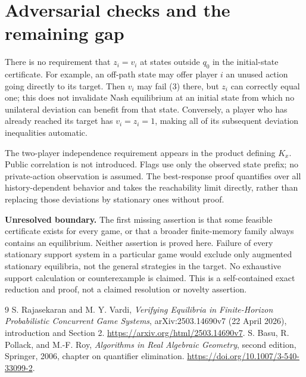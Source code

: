 \documentclass[11pt]{article}
\theoremstyle{remark}\newtheorem{remark}[theorem]{Remark}
\begin{document}
\section*{Adversarial checks and the remaining gap}
There is no requirement that $z_i=v_i$ at states outside $q_0$ in the initial-state certificate. For example, an off-path state may offer player $i$ an unused action going directly to its target. Then $v_i$ may fail (3) there, but $z_i$ can correctly equal one; this does not invalidate Nash equilibrium at an initial state from which no unilateral deviation can benefit from that state. Conversely, a player who has already reached its target has $v_i=z_i=1$, making all of its subsequent deviation inequalities automatic.

The two-player independence requirement appears in the product defining $K_x$. Public correlation is not introduced. Flags use only the observed state prefix; no private-action observation is assumed. The best-response proof quantifies over all history-dependent behavior and takes the reachability limit directly, rather than replacing those deviations by stationary ones without proof.

\textbf{Unresolved boundary.} The first missing assertion is that some feasible certificate exists for every game, or that a broader finite-memory family always contains an equilibrium. Neither assertion is proved here. Failure of every stationary support system in a particular game would exclude only augmented stationary equilibria, not the general strategies in the target. No exhaustive support calculation or counterexample is claimed. This is a self-contained exact reduction and proof, not a claimed resolution or novelty assertion.

\begin{thebibliography}{9}
 S. Rajasekaran and M. Y. Vardi, \emph{Verifying Equilibria in Finite-Horizon Probabilistic Concurrent Game Systems}, arXiv:2503.14690v7 (22 April 2026), introduction and Section 2. \url{https://arxiv.org/html/2503.14690v7}.
 S. Basu, R. Pollack, and M.-F. Roy, \emph{Algorithms in Real Algebraic Geometry}, second edition, Springer, 2006, chapter on quantifier elimination. \url{https://doi.org/10.1007/3-540-33099-2}.
\end{thebibliography}
\end{document}

